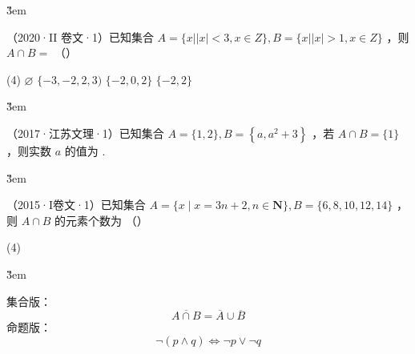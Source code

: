 \v{3em}

\begin{example}
    （2020·II 卷文·1）已知集合 $A=\{x| | x \mid<3, x \in Z\}, B=\{x| | x \mid>1, x \in Z\}$ ，则 $A \cap B=$ （\qquad）
    \begin{tasks}(4)
        \task $\varnothing$
        \task $\{-3,-2,2,3)$
        \task $\{-2,0,2\}$
        \task $\{-2,2\}$
    \end{tasks}
\end{example}

\v{3em}

\begin{example}
    （2017·江苏文理·1）已知集合 $A=\{1,2\}, B=\left\{a, a^2+3\right\}$ ，若 $A \cap B=\{1\}$ ，则实数 $a$ 的值为 \underline{\qquad}.
\end{example}

\v{3em}

\begin{example}
    （2015·I卷文·1）已知集合 $A=\{x \mid x=3 n+2, n \in \mathbf{N}\}, B=\{6,8,10,12,14\}$ ，则 $A \cap B$ 的元素个数为 （\qquad）
    \begin{tasks}(4)
    \end{tasks}
\end{example}

\v{3em}

\begin{theorem}
    \begin{minipage}{0.5\textwidth}
        集合版：
        $$
            \overline{A\cap B} = \overline{A}\cup \overline{B}
        $$
        命题版：
        $$
            \neg (p \land q) \iff \neg p \lor \neg q
        $$
    \end{minipage}%
    \begin{minipage}{0.5\textwidth}
        \centering
    \end{minipage}
\end{theorem}

